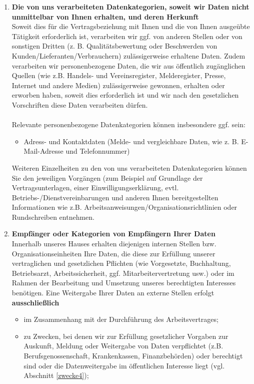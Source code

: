 \documentclass[a4paper, fontsize=11pt]{scrartcl}
\begin{document}
\begin{enumerate}[label=\textbf{\arabic*.},ref=\arabic*]
\begin{enumerate}[label=\textbf{\ref{zwecke}.\arabic*},ref=\ref{zwecke}.\arabic*]
  \end{enumerate}
  \item \label{Datenkategorien} \textbf{Die von uns verarbeiteten Datenkategorien, soweit wir Daten nicht unmittelbar von Ihnen erhalten, und deren Herkunft} \\ Soweit dies für die Vertragsbeziehung mit Ihnen und die von Ihnen ausgeübte Tätigkeit erforderlich ist, verarbeiten wir ggf. von anderen Stellen oder von sonstigen Dritten (z. B. Qualitätsbewertung oder Beschwerden von Kunden/Lieferanten/Verbrauchern) zulässigerweise erhaltene Daten. Zudem verarbeiten wir personenbezogene Daten, die wir aus öffentlich zugänglichen Quellen (wie z.B. Handels- und Vereinsregister, Melderegister, Presse, Internet und andere Medien) zulässigerweise gewonnen, erhalten oder erworben haben, soweit dies erforderlich ist und wir nach den gesetzlichen Vorschriften diese Daten verarbeiten dürfen. \\\\ Relevante personenbezogene Datenkategorien können insbesondere ggf. sein: \\
  \begin{itemize}
    \item Adress- und Kontaktdaten (Melde- und vergleichbare Daten, wie z. B. E-Mail-Adresse und Telefonnummer)
  \end{itemize}
   Weiteren Einzelheiten zu den von uns verarbeiteten Datenkategorien können Sie den jeweiligen Vorgängen (zum Beispiel auf Grundlage der Vertragsunterlagen, einer Einwilligungserklärung, evtl. Betriebs-/Dienstvereinbarungen und anderen Ihnen bereitgestellten Informationen wie z.B. Arbeitsanweisungen/Organisationsrichtlinien oder Rundschreiben entnehmen.
  \item \label{empfaenger} \textbf{Empfänger oder Kategorien von Empfängern Ihrer Daten} \\ Innerhalb unseres Hauses erhalten diejenigen internen Stellen bzw. Organisationseinheiten Ihre Daten, die diese zur Erfüllung unserer vertraglichen und gesetzlichen Pflichten (wie Vorgesetzte, Buchhaltung, Betriebsarzt, Arbeitssicherheit, ggf. Mitarbeitervertretung usw.) oder im Rahmen der Bearbeitung und Umsetzung unseres berechtigten Interesses benötigen. Eine Weitergabe Ihrer Daten an externe Stellen erfolgt \textbf{ausschließlich}
  \begin{itemize}
    \item im Zusammenhang mit der Durchführung des Arbeitsvertrages;
    \item zu Zwecken, bei denen wir zur Erfüllung gesetzlicher Vorgaben zur Auskunft, Meldung oder Weitergabe von Daten verpflichtet (z.B. Berufsgenossenschaft, Krankenkassen, Finanzbehörden) oder berechtigt sind oder die Datenweitergabe im öffentlichen Interesse liegt (vgl. Abschnitt \ref{zwecke4});

\end{itemize}
\end{enumerate}
\end{document}
